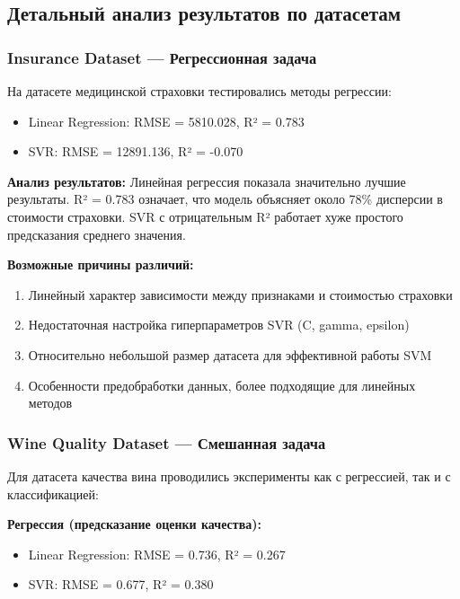 \documentclass[a4paper]{article}
\begin{document}
\subsection{Детальный анализ результатов по датасетам}

\subsubsection{Insurance Dataset — Регрессионная задача}

На датасете медицинской страховки тестировались методы регрессии:
\begin{itemize}
    \item Linear Regression: RMSE = 5810.028, R² = 0.783
    \item SVR: RMSE = 12891.136, R² = -0.070
\end{itemize}

\textbf{Анализ результатов:}
Линейная регрессия показала значительно лучшие результаты. R² = 0.783 означает, что модель объясняет около 78\% дисперсии в стоимости страховки. SVR с отрицательным R² работает хуже простого предсказания среднего значения.

\textbf{Возможные причины различий:}
\begin{enumerate}
    \item Линейный характер зависимости между признаками и стоимостью страховки
    \item Недостаточная настройка гиперпараметров SVR (C, gamma, epsilon)
    \item Относительно небольшой размер датасета для эффективной работы SVM
    \item Особенности предобработки данных, более подходящие для линейных методов
\end{enumerate}

\subsubsection{Wine Quality Dataset — Смешанная задача}

Для датасета качества вина проводились эксперименты как с регрессией, так и с классификацией:

\textbf{Регрессия (предсказание оценки качества):}
\begin{itemize}
    \item Linear Regression: RMSE = 0.736, R² = 0.267
    \item SVR: RMSE = 0.677, R² = 0.380
\end{itemize}
\end{document}
